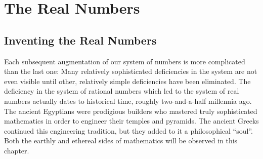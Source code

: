 \section{The Real Numbers}
\label{sec:reals}

\subsection{Inventing the Real Numbers}
\label{sec:real-history}

Each subsequent augmentation of our system of numbers is more complicated than the last one: Many relatively sophisticated deficiencies in the system are not even visible until other, relatively simple deficiencies have been eliminated.  The deficiency in the system of rational numbers which led to the system of real numbers actually dates to historical time, roughly two-and-a-half millennia ago.  The ancient Egyptians were prodigious builders who mastered truly sophisticated mathematics in order to engineer their temples and pyramids.  The ancient Greeks continued this engineering tradition, but they added to it a philosophical ``soul''.  Both the earthly and ethereal sides of mathematics will be observed in this chapter.

\smallskip

